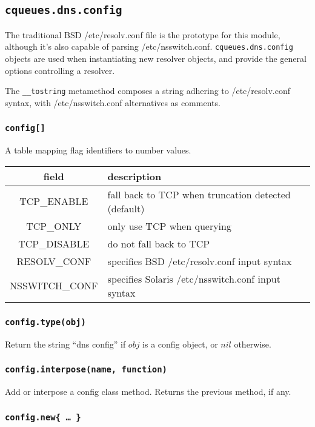 \documentclass[11pt, oneside]{memoir}
\newcommand{\routine}[1]{\texttt{#1} }
\newcommand{\fn}[1]{\texttt{#1} }
\newcommand{\module}[1]{\texttt{#1} }
\newcounter{toccols}
\newenvironment{Module}[1]{
	\subsection{\texttt{#1}}
	\addtocontents{toc}{
		\protect\begin{multicols}{\value{toccols}}
	}
}{
	\addtocontents{toc}{\protect\end{multicols}}
}
\begin{document}
\begin{Module}{cqueues.dns.config}

The traditional BSD /etc/resolv.conf file is the prototype for this module, although it's also capable of parsing /etc/nsswitch.conf. \module{cqueues.dns.config} objects are used when instantiating new resolver objects, and provide the general options controlling a resolver.

The \fn{\_\_tostring} metamethod composes a string adhering to /etc/resolv.conf syntax, with /etc/nsswitch.conf alternatives as comments.

\subsubsection[\fn{config[]}]{\fn{config[]}}

A table mapping flag identifiers to number values.

\begin{tabular}{ c | l }
field & description\\\hline
TCP\_ENABLE & fall back to TCP when truncation detected (default)\\
TCP\_ONLY & only use TCP when querying\\
TCP\_DISABLE & do not fall back to TCP\\
RESOLV\_CONF & specifies BSD /etc/resolv.conf input syntax\\
NSSWITCH\_CONF & specifies Solaris /etc/nsswitch.conf input syntax
\end{tabular}

\subsubsection[\routine{config.type}]{\routine{config.type(obj)}}
Return the string ``dns config'' if $obj$ is a config object, or $nil$ otherwise.

\subsubsection[\fn{config.interpose}]{\fn{config.interpose(name, function)}}

Add or interpose a config class method. Returns the previous method, if any.

\subsubsection[\fn{config.new}]{\fn{config.new\{ … \}}}


\end{Module}
\end{document}
